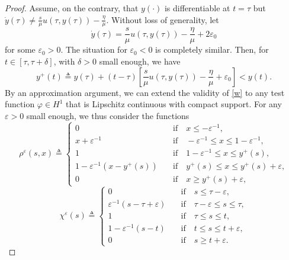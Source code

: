 \documentclass[10pt]{article}
\numberwithin{equation}{section}
\begin{document}
\begin{proof}
		Assume, on the contrary, that $y(\cdot)$ is differentiable at $t=\tau$ but $\dot{y}(\tau)\neq \frac{s}{\mu}u(\tau,y(\tau))-\frac{\eta}{\mu}$. Without loss of generality, let
		\begin{equation}\label{dot_y_contrary}
			\dot{y}(\tau)=\frac{s}{\mu}u(\tau,y(\tau))-\frac{\eta}{\mu}+2\varepsilon_0
		\end{equation}
		for some $\varepsilon_0>0$. The situation for $\varepsilon_0<0$ is completely similar. Then, for $t\in[\tau,\tau+\delta]$, with $\delta>0$ small enough, we have
		\begin{equation}
			y^+(t)\triangleq y(\tau)+(t-\tau)\left[\frac{s}{\mu}u(\tau,y(\tau))-\frac{\eta}{\mu}+\varepsilon_0\right]<y(t).
		\end{equation}
		By an approximation argument, we can extend the validity of \eqref{w} to any test function $\varphi \in H^1$ that is Lipschitz continuous with compact support. For any $\varepsilon>0$ small enough, we thus consider the functions
		\begin{equation*}
			\rho^\varepsilon(s,x)\triangleq\left\{
			\begin{array}{cll}
				0 & \quad\mathrm{if}\quad x\leq-\varepsilon^{-1}, \\
				x+\varepsilon^{-1} & \quad\mathrm{if}\quad-\varepsilon^{-1}\leq x\leq1-\varepsilon^{-1}, \\
				1 & \quad\mathrm{if}\quad1-\varepsilon^{-1}\leq x\leq y^+(s), \\
				1-\varepsilon^{-1}(x-y^+(s)) & \quad\mathrm{if}\quad y^+(s)\leq x\leq y^+(s)+\varepsilon, \\
				0 & \quad\mathrm{if}\quad x\geq y^+(s)+\varepsilon,
			\end{array}\right.
		\end{equation*}
		\begin{equation}\label{chi_epsilon}
			\chi^\varepsilon(s)\triangleq\left\{
			\begin{array}{cll}
				0 & \quad\mathrm{if}\quad s\leq\tau-\varepsilon, \\
				\varepsilon^{-1}(s-\tau+\varepsilon) & \quad\mathrm{if}\quad\tau-\varepsilon\leq s\leq\tau, \\
				1 & \quad\mathrm{if}\quad\tau\leq s\leq t, \\
				1-\varepsilon^{-1}(s-t) & \quad\mathrm{if}\quad t\leq s\leq t+\varepsilon, \\
				0 & \quad\mathrm{if}\quad s\geq t+\varepsilon.
			\end{array}\right.
		\end{equation}

\end{proof}
\end{document}
